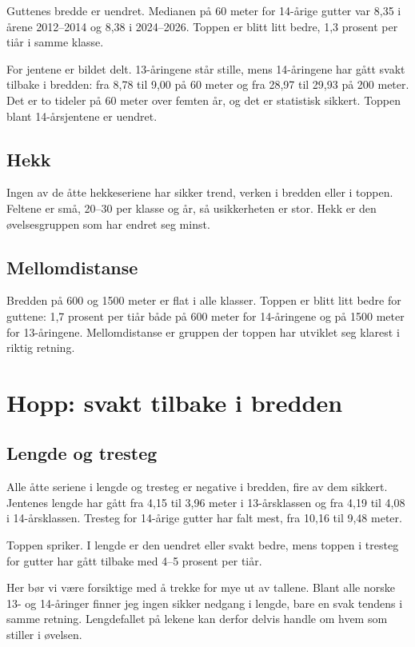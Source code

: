 Guttenes bredde er uendret. Medianen på 60 meter for 14-årige gutter var 8,35 i årene 2012--2014 og 8,38 i 2024--2026. Toppen er blitt litt bedre, 1,3 prosent per tiår i samme klasse.

For jentene er bildet delt. 13-åringene står stille, mens 14-åringene har gått svakt tilbake i bredden: fra 8,78 til 9,00 på 60 meter og fra 28,97 til 29,93 på 200 meter. Det er to tideler på 60 meter over femten år, og det er statistisk sikkert. Toppen blant 14-årsjentene er uendret.

\subsection{Hekk}\label{hekk}

Ingen av de åtte hekkeseriene har sikker trend, verken i bredden eller i toppen. Feltene er små, 20--30 per klasse og år, så usikkerheten er stor. Hekk er den øvelsesgruppen som har endret seg minst.

\subsection{Mellomdistanse}\label{mellomdistanse}

Bredden på 600 og 1500 meter er flat i alle klasser. Toppen er blitt litt bedre for guttene: 1,7 prosent per tiår både på 600 meter for 14-åringene og på 1500 meter for 13-åringene. Mellomdistanse er gruppen der toppen har utviklet seg klarest i riktig retning.

\section{Hopp: svakt tilbake i bredden}\label{hopp-svakt-tilbake-i-bredden}

\subsection{Lengde og tresteg}\label{lengde-og-tresteg}

Alle åtte seriene i lengde og tresteg er negative i bredden, fire av dem sikkert. Jentenes lengde har gått fra 4,15 til 3,96 meter i 13-årsklassen og fra 4,19 til 4,08 i 14-årsklassen. Tresteg for 14-årige gutter har falt mest, fra 10,16 til 9,48 meter.

Toppen spriker. I lengde er den uendret eller svakt bedre, mens toppen i tresteg for gutter har gått tilbake med 4--5 prosent per tiår.

Her bør vi være forsiktige med å trekke for mye ut av tallene. Blant alle norske 13- og 14-åringer finner jeg ingen sikker nedgang i lengde, bare en svak tendens i samme retning. Lengdefallet på lekene kan derfor delvis handle om hvem som stiller i øvelsen.

